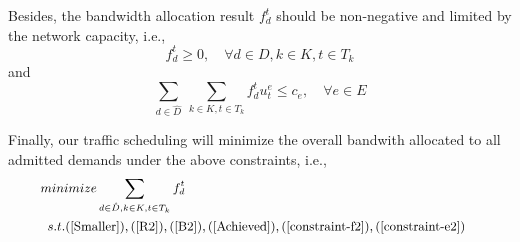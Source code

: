 \documentclass[sigconf]{acmart}
\begin{document}
Besides, the bandwidth allocation result $f_{d}^t$ should be non-negative and limited by the network capacity, i.e.,
\begin{equation}
f_{d}^t \ge 0, \quad\forall d \in D ,  k\in K,   t\in T_{k}
\label{constraint-f2}
\end{equation}
and
\begin{equation}
 \sum_{d \in \hat{D}}\ \sum_{k\in K, t\in T_{k}}f_{d}^tu_t^e \le c_e, \quad \forall e \in E
\label{constraint-e2}
\end{equation}

Finally, our traffic scheduling will minimize the overall bandwith allocated to all admitted demands 
under the above constraints, i.e., 
\begin{equation}
\small
\begin{aligned} \label{BATE-TE}
&minimize \sum_{d \in \hat{D}, k \in K, t \in T_k} f_d^t  \\
&\begin{array}{r@{\quad}r@{}l@{\quad}l}
s.t.  (\ref{Smaller}), (\ref{R2}), (\ref{B2}), (\ref{Achieved}), (\ref{constraint-f2}), (\ref{constraint-e2})
\end{array}
\end{aligned}
\end{equation}

\end{document}
